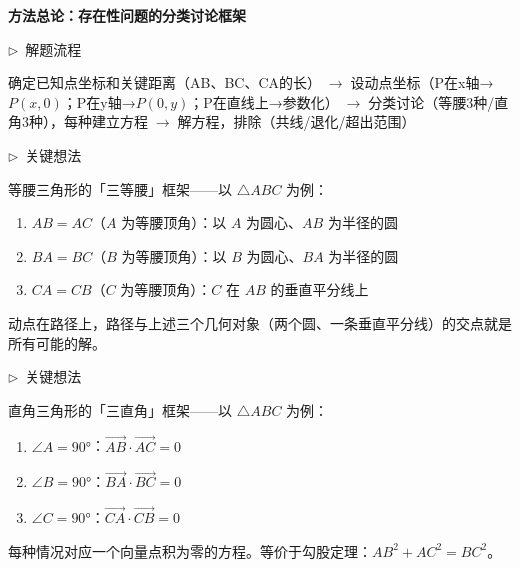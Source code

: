 \documentclass{exam-zh}
\newcommand{\edukai}{\kaishu}
\newcommand{\eduSectionTitle}[1]{%
  \needspace{5\baselineskip}%
  \vspace{2mm}
  {\color{edu-blue}\bfseries\large #1}\par
  \vspace{3mm}
}
\newenvironment{eduAuxItem}[1]{%
  \needspace{4\baselineskip}%
  \vspace{2mm}
  \par\noindent
  \hangindent=8mm\hangafter=1
  {\color{edu-blue}\edukai $\triangleright$~#1}\enspace
  \begingroup
  \color{edu-ink}
  \edukai
}{%
  \endgroup
  \par
  \vspace{4mm}
}
\begin{document}
\eduSectionTitle{方法总论：存在性问题的分类讨论框架}





\begin{eduAuxItem}{解题流程}
确定已知点坐标和关键距离（AB、BC、CA的长）$\;\to\;$设动点坐标（P在x轴→$P(x,0)$；P在y轴→$P(0,y)$；P在直线上→参数化）$\;\to\;$分类讨论（等腰3种/直角3种），每种建立方程$\;\to\;$解方程，排除（共线/退化/超出范围）\end{eduAuxItem}




\begin{eduAuxItem}{关键想法}
等腰三角形的「三等腰」框架——以 $\triangle ABC$ 为例：
\begin{enumerate}
  \item $AB = AC$（$A$ 为等腰顶角）：以 $A$ 为圆心、$AB$ 为半径的圆
  \item $BA = BC$（$B$ 为等腰顶角）：以 $B$ 为圆心、$BA$ 为半径的圆
  \item $CA = CB$（$C$ 为等腰顶角）：$C$ 在 $AB$ 的垂直平分线上
\end{enumerate}
动点在路径上，路径与上述三个几何对象（两个圆、一条垂直平分线）的交点就是所有可能的解。\end{eduAuxItem}




\begin{eduAuxItem}{关键想法}
直角三角形的「三直角」框架——以 $\triangle ABC$ 为例：
\begin{enumerate}
  \item $\angle A = 90°$：$\overrightarrow{AB} \cdot \overrightarrow{AC} = 0$
  \item $\angle B = 90°$：$\overrightarrow{BA} \cdot \overrightarrow{BC} = 0$
  \item $\angle C = 90°$：$\overrightarrow{CA} \cdot \overrightarrow{CB} = 0$
\end{enumerate}
每种情况对应一个向量点积为零的方程。等价于勾股定理：$AB^2 + AC^2 = BC^2$。\end{eduAuxItem}
\end{document}
